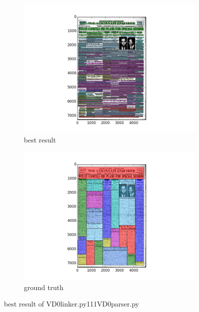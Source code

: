 \documentclass[a4paper,10pt]{article}
\begin{document}
\newpage

					\begin{figure}
					\centering
					\begin{subfigure}{.5\textwidth}
					  \centering
					  \includegraphics[width=10cm]
					{VD0linker.py111VD0parser.py.best.png}
					  \caption{best result}
					  \label{fig:sub1}
					\end{subfigure}%
					\begin{subfigure}{.5\textwidth}
					  \centering
					  \includegraphics[width=10cm]
					{VD0linker.py111VD0parser.py.gt.best.png}
					  \caption{ground truth}
					  \label{fig:sub2}
					\end{subfigure}
					\caption
					{best result of VD0linker.py111VD0parser.py}
					\label{fig:test}
					\end{figure}
					
\end{document}
